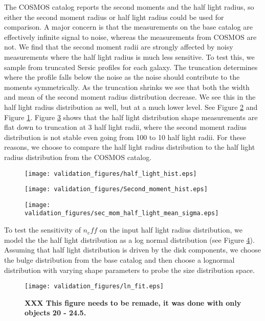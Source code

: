 \documentclass[]{article}
\begin{document}
The COSMOS catalog reports the second moments and the 
half light radius, so either the second moment radius or half light radius could be used for comparison.  A major concern is that the measurements
on the base catalog are effectively infinite signal to noise, whereas the measurements from COSMOS are not.  We find that the second moment 
radii are strongly affected by noisy measurements where the half light radius is much less sensitive.  To test this, we sample from truncated Sersic
profiles for each galaxy.  The truncation determines where the profile falls below the noise as the noise should contribute to the moments symmetrically.
As the truncation shrinks we see that both the width and mean of the second moment radius distribution decrease.  We see this in the
half light radius distribution as well, but at a much lower level.  See Figure \ref{fig:mom_hist} and Figure \ref{fig:hl_hist}.  Figure
\ref{fig:mom_hl_line} shows that the half light distribution shape measurements are flat down to truncation at 3 half light radii, where 
the second moment radius distribution is not stable even going from 100 to 10 half light radii.  For these reasons, we choose to compare the half light 
radius distribution to the half light radius distribution from the COSMOS catalog.
\begin{figure}
\centering
\texttt{[image: validation\_figures/half\_light\_hist.eps]}
\caption{\label{fig:hl_hist}}
\end{figure}
\begin{figure}
\centering
\texttt{[image: validation\_figures/Second\_moment\_hist.eps]}
\caption{\label{fig:mom_hist}}
\end{figure}
\begin{figure}
\centering
\texttt{[image: validation\_figures/sec\_mom\_half\_light\_mean\_sigma.eps]}
\caption{\label{fig:mom_hl_line}}
\end{figure}

To test the sensitivity of $n_eff$ on the input half light radius distribution, we model the the half light distribution as a log normal distribution (see Figure
\ref{fig:hl_dist}).  Assuming that half light distribution is driven by the disk components, we choose the bulge distribution from the base catalog and then
choose a lognormal distribution with varying shape parameters to probe the size distribution space.
\begin{figure}
\centering
\texttt{[image: validation\_figures/ln\_fit.eps]}
\caption{{\bf XXX This figure needs to be remade, it was done with only objects 20 - 24.5.}\label{fig:hl_dist}}
\end{figure}
\end{document}
